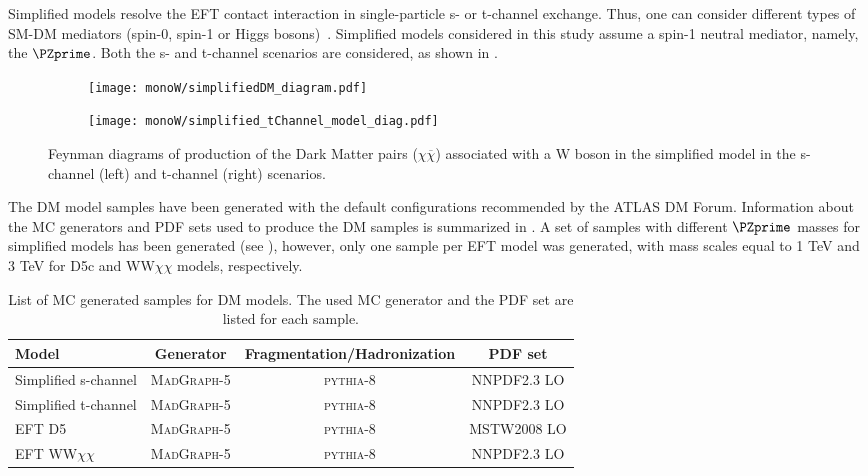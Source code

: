 Simplified models resolve the EFT contact interaction in single-particle 
s- or t-channel exchange. Thus, one can consider different types of SM-DM mediators (spin-0, spin-1 or Higgs bosons)~\cite{dm_simplified_models}.
Simplified models considered in this study assume a spin-1 neutral mediator, namely, the $\PZprime$. Both the s- and t-channel scenarios are considered, as shown in .

\begin{figure}[]

\centering
\begin{subfigure}{.5\textwidth}
  \centering
  \texttt{[image: monoW/simplifiedDM\_diagram.pdf]}
\end{subfigure}%
\begin{subfigure}{.5\textwidth}
  \centering
  \texttt{[image: monoW/simplified\_tChannel\_model\_diag.pdf]}
\end{subfigure}
  \caption{Feynman diagrams of production of the Dark Matter pairs ($\chi\overline{\chi}$) associated with a W boson in the simplified model 
	   in the s-channel (left) and t-channel (right) scenarios.}
  \label{fig:feynMonoWSimple}
\end{figure}

The DM model samples have been generated with the default configurations recommended by the ATLAS DM Forum. Information about the MC generators and PDF sets used to produce the DM samples is summarized in .
A set of samples with different $\PZprime$ masses for simplified models has been generated (see ),
however, only one sample per EFT model was generated, with mass scales equal to 1 TeV and 3 TeV for D5c and WW$\chi\chi$ models, respectively.

\begin{table}[ht]
  \begin{center}
    \begin{tabular}{l|c|c|c}

Model &  Generator & Fragmentation/Hadronization  & PDF set \\
\hline\hline
Simplified s-channel & M{\scshape ad}G{\scshape raph}-5 & {\scshape pythia-8} & NNPDF2.3 LO \\
Simplified t-channel & M{\scshape ad}G{\scshape raph}-5 & {\scshape pythia-8} & NNPDF2.3 LO \\
EFT D5 & M{\scshape ad}G{\scshape raph}-5 & {\scshape pythia-8} & MSTW2008 LO \\
EFT WW$\chi\chi$ & M{\scshape ad}G{\scshape raph}-5 & {\scshape pythia-8} & NNPDF2.3 LO \\

\end{tabular}
\end{center}
  \caption{List of MC generated samples for DM models. The used MC generator and the PDF set are listed for each sample.
  }
\label{tab:monoW_samples}
\end{table}

